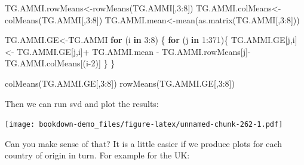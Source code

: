 \documentclass[
]{book}
\newenvironment{Shaded}{\begin{snugshade}}{\end{snugshade}}
\newcommand{\AttributeTok}[1]{\textcolor[rgb]{0.77,0.63,0.00}{#1}}
\newcommand{\ControlFlowTok}[1]{\textcolor[rgb]{0.13,0.29,0.53}{\textbf{#1}}}
\newcommand{\DecValTok}[1]{\textcolor[rgb]{0.00,0.00,0.81}{#1}}
\newcommand{\FloatTok}[1]{\textcolor[rgb]{0.00,0.00,0.81}{#1}}
\newcommand{\FunctionTok}[1]{\textcolor[rgb]{0.00,0.00,0.00}{#1}}
\newcommand{\NormalTok}[1]{#1}
\newcommand{\OtherTok}[1]{\textcolor[rgb]{0.56,0.35,0.01}{#1}}
\newcommand{\SpecialCharTok}[1]{\textcolor[rgb]{0.00,0.00,0.00}{#1}}
\begin{document}
\begin{Shaded}
\begin{Highlighting}[]
\NormalTok{TG.AMMI.rowMeans}\OtherTok{\textless{}{-}}\FunctionTok{rowMeans}\NormalTok{(TG.AMMI[,}\DecValTok{3}\SpecialCharTok{:}\DecValTok{8}\NormalTok{])}
\NormalTok{TG.AMMI.colMeans}\OtherTok{\textless{}{-}}\FunctionTok{colMeans}\NormalTok{(TG.AMMI[,}\DecValTok{3}\SpecialCharTok{:}\DecValTok{8}\NormalTok{])}
\NormalTok{TG.AMMI.mean}\OtherTok{\textless{}{-}}\FunctionTok{mean}\NormalTok{(}\FunctionTok{as.matrix}\NormalTok{(TG.AMMI[,}\DecValTok{3}\SpecialCharTok{:}\DecValTok{8}\NormalTok{]))        }

\NormalTok{TG.AMMI.GE}\OtherTok{\textless{}{-}}\NormalTok{TG.AMMI}
 \ControlFlowTok{for}\NormalTok{ (i }\ControlFlowTok{in} \DecValTok{3}\SpecialCharTok{:}\DecValTok{8}\NormalTok{) \{}
   \ControlFlowTok{for}\NormalTok{ (j }\ControlFlowTok{in} \DecValTok{1}\SpecialCharTok{:}\DecValTok{371}\NormalTok{)\{ }
\NormalTok{     TG.AMMI.GE[j,i]}\OtherTok{\textless{}{-}}
\NormalTok{     TG.AMMI.GE[j,i]}\SpecialCharTok{+}\NormalTok{ TG.AMMI.mean }\SpecialCharTok{{-}}\NormalTok{ TG.AMMI.rowMeans[j]}\SpecialCharTok{{-}}\NormalTok{ TG.AMMI.colMeans[(i}\DecValTok{{-}2}\NormalTok{)]}
\NormalTok{     \}}
\NormalTok{ \}}

\FunctionTok{colMeans}\NormalTok{(TG.AMMI.GE[,}\DecValTok{3}\SpecialCharTok{:}\DecValTok{8}\NormalTok{])}
\FunctionTok{rowMeans}\NormalTok{(TG.AMMI.GE[,}\DecValTok{3}\SpecialCharTok{:}\DecValTok{8}\NormalTok{])}
\end{Highlighting}
\end{Shaded}

Then we can run svd and plot the results:

\begin{Shaded}
\end{Shaded}

\texttt{[image: bookdown-demo\_files/figure-latex/unnamed-chunk-262-1.pdf]}

Can you make sense of that? It is a little easier if we produce plots for each country of origin in turn. For example for the UK:
\end{document}
